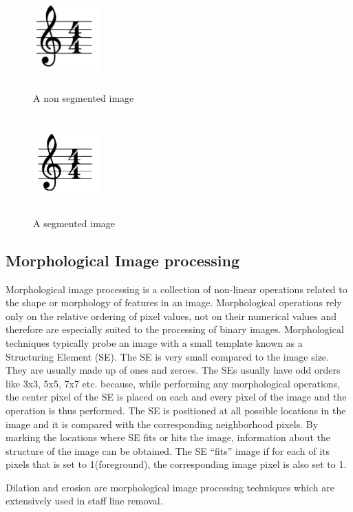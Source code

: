 \documentclass[journal]{IEEEtran}
\begin{document}
\begin{figure}
\includegraphics[width=1in,height=1.5in,clip,keepaspectratio]{resources/implementation/non_segmented_image}
\centering
\caption{A non segmented image}
\end{figure}

\begin{figure}
\includegraphics[width=1.0in,height=1.5in,clip,keepaspectratio]{resources/implementation/segmented_image}
\centering
\caption{A segmented image}
\end{figure}

\subsection{Morphological Image processing}
Morphological image processing is a collection of non-linear operations related to the shape or morphology of features in an image. Morphological operations rely only on the relative ordering of
pixel values, not on their numerical values and therefore are especially suited to the processing of binary images. Morphological techniques typically probe an image with a small template known as a Structuring Element (SE). The SE is very small compared to the image size. They are usually made up of
ones and zeroes. The SEs usually have odd orders like 3x3, 5x5, 7x7 etc. because, while performing any morphological operations, the center pixel of the SE is placed on each and every pixel of the
image and the operation is thus performed. The SE is positioned at all possible locations in the image and it is compared with the corresponding neighborhood pixels. By marking the locations
where SE fits or hits the image, information about the structure of the image can be obtained. The SE ``fits” image if for each of its pixels that is set to 1(foreground), the corresponding image pixel
is also set to 1.\par Dilation and erosion are morphological image processing techniques which are extensively used in staff line removal.
\end{document}
